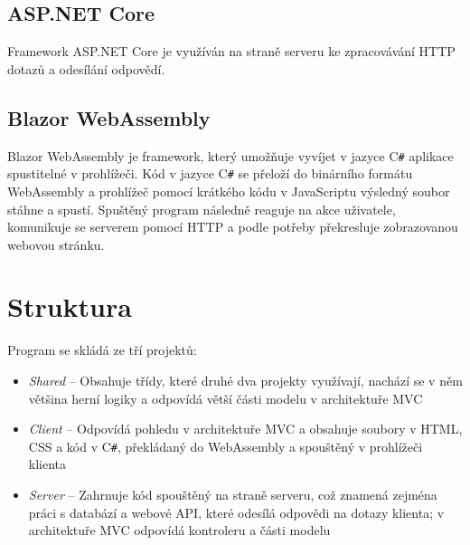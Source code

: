 \documentclass[a4paper,12pt]{article}
\def\CS{C\texttt{\#}}
\begin{document}
\subsection{ASP.NET Core}
Framework ASP.NET Core je využíván na straně serveru ke zpracovávání HTTP dotazů a odesílání odpovědí.
\subsection{Blazor WebAssembly}
Blazor WebAssembly je framework, který umožňuje vyvíjet v jazyce  \CS{} aplikace spustitelné v prohlížeči. Kód v jazyce  \CS{} se přeloží do binárního formátu WebAssembly a prohlížeč pomocí krátkého kódu v JavaScriptu výsledný soubor stáhne a spustí. Spuštěný program následně reaguje na akce uživatele, komunikuje se serverem pomocí HTTP a podle potřeby překresluje zobrazovanou webovou stránku.

\section{Struktura}
Program se skládá ze tří projektů:
\begin{itemize}
\item\textit{Shared} -- Obsahuje třídy, které druhé dva projekty využívají, nachází se v něm většina herní logiky a odpovídá větší části modelu v architektuře MVC\cite{mvc}
\item\textit{Client} -- Odpovídá pohledu v architektuře MVC a obsahuje soubory v HTML, CSS a kód v  \CS{}, překládaný do WebAssembly a spouštěný v prohlížeči klienta
\item\textit{Server} -- Zahrnuje kód spouštěný na straně serveru, což znamená zejména práci s databází a webové API, které odesílá odpovědi na dotazy klienta; v architektuře MVC odpovídá kontroleru a části modelu
\end{itemize}
\newpage
\printbibliography[heading=bibintoc, title={Použitá literatura}]
\end{document}
